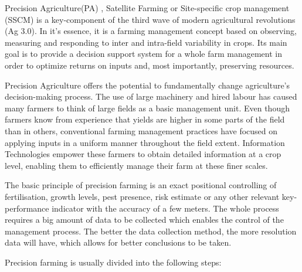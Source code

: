 Precision Agriculture(PA) , Satellite Farming or Site-specific crop management (SSCM) is a key-component  of the third wave of modern agricultural revolutions (Ag 3.0). In it's essence, it is a farming management concept based on observing, measuring and responding to inter and intra-field variability in crops. Its main goal is to provide a decision support system for a whole farm management in order to optimize returns on inputs and, most importantly, preserving resources.

Precision Agriculture offers the potential to fundamentally change agriculture's decision-making process. The use of large machinery and hired labour has caused many farmers to think of large fields as a basic management unit. Even though farmers know from experience that yields are higher in some parts of the field than in others, conventional farming management practices have focused on applying inputs in a uniform manner throughout the field extent. Information Technologies empower these farmers to obtain detailed information at a crop level, enabling them to efficiently manage their farm at these finer scales.

The basic principle of precision farming is an exact positional controlling of fertilisation, growth levels, pest presence, risk estimate or any other relevant key-performance indicator with the accuracy of a few meters. The whole process requires a big amount of data to be collected which enables the control of the management process. The better the data collection method, the more resolution data will have, which allows for better conclusions to be taken.

Precision farming is usually divided into the following steps:

